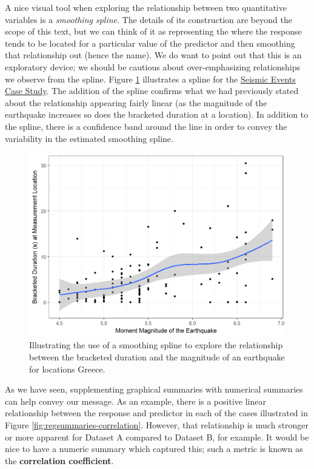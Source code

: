 \documentclass[]{book}
\theoremstyle{definition}
\theoremstyle{definition}
\theoremstyle{definition}
\theoremstyle{remark}
\begin{document}
A nice visual tool when exploring the relationship between two
quantitative variables is a \emph{smoothing spline}. The details of its
construction are beyond the scope of this text, but we can think of it
as representing the where the response tends to be located for a
particular value of the predictor and then smoothing that relationship
out (hence the name). We do want to point out that this is an
exploratory device; we should be cautious about over-emphasizing
relationships we observe from the spline. Figure
\ref{fig:regsummaries-spline} illustrates a spline for the
\protect\hyperlink{CaseGreece}{Seismic Events Case Study}. The addition
of the spline confirms what we had previously stated about the
relationship appearing fairly linear (as the magnitude of the earthquake
increases so does the bracketed duration at a location). In addition to
the spline, there is a confidence band around the line in order to
convey the variability in the estimated smoothing spline.

\begin{figure}

{\centering \includegraphics[width=0.8\linewidth]{./Images/regsummaries-spline-1} 

}

\caption{Illustrating the use of a smoothing spline to explore the relationship between the bracketed duration and the magnitude of an earthquake for locations Greece.}\label{fig:regsummaries-spline}
\end{figure}

As we have seen, supplementing graphical summaries with numerical
summaries can help convey our message. As an example, there is a
positive linear relationship between the response and predictor in each
of the cases illustrated in Figure \ref{fig:regsummaries-correlation}.
However, that relationship is much stronger or more apparent for Dataset
A compared to Dataset B, for example. It would be nice to have a numeric
summary which captured this; such a metric is known as the
\textbf{correlation coefficient}.
\end{document}
